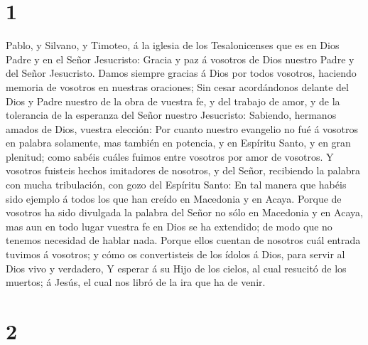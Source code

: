 \hypertarget{section}{%
\section{1}\label{section}}

 Pablo, y Silvano, y Timoteo, á la iglesia de los
Tesalonicenses que es en Dios Padre y en el Señor Jesucristo: Gracia y
paz á vosotros de Dios nuestro Padre y del Señor Jesucristo.
 Damos siempre gracias á Dios por todos vosotros, haciendo
memoria de vosotros en nuestras oraciones;  Sin cesar
acordándonos delante del Dios y Padre nuestro de la obra de vuestra fe,
y del trabajo de amor, y de la tolerancia de la esperanza del Señor
nuestro Jesucristo:  Sabiendo, hermanos amados de Dios,
vuestra elección:  Por cuanto nuestro evangelio no fué á
vosotros en palabra solamente, mas también en potencia, y en Espíritu
Santo, y en gran plenitud; como sabéis cuáles fuimos entre vosotros por
amor de vosotros.  Y vosotros fuisteis hechos imitadores
de nosotros, y del Señor, recibiendo la palabra con mucha tribulación,
con gozo del Espíritu Santo:  En tal manera que habéis
sido ejemplo á todos los que han creído en Macedonia y en Acaya.
 Porque de vosotros ha sido divulgada la palabra del Señor
no sólo en Macedonia y en Acaya, mas aun en todo lugar vuestra fe en
Dios se ha extendido; de modo que no tenemos necesidad de hablar nada.
 Porque ellos cuentan de nosotros cuál entrada tuvimos á
vosotros; y cómo os convertisteis de los ídolos á Dios, para servir al
Dios vivo y verdadero,  Y esperar á su Hijo de los
cielos, al cual resucitó de los muertos; á Jesús, el cual nos libró de
la ira que ha de venir.

\hypertarget{section-1}{%
\section{2}\label{section-1}}

